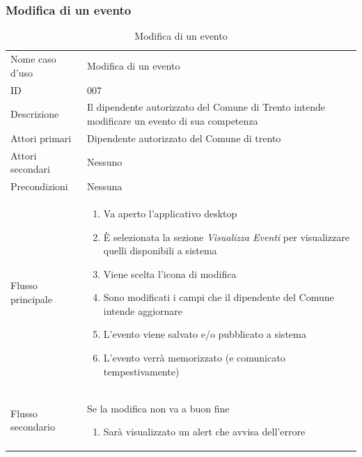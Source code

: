 \documentclass{article}
\begin{document}
\clearpage

\subsubsection{Modifica di un evento}

\begin{table}[htbp]
    \label{8.3.3}
    \centering
    \begin{tabularx}{\textwidth}{| l | p{} |}
        \Xhline{2pt} %
        Nome caso d'uso & Modifica di un evento \\
        \Xhline{2pt} %
        ID & 007 \\
        \hline
        Descrizione & Il dipendente autorizzato del Comune di Trento intende modificare un evento di sua competenza\\
        \hline
        Attori primari & Dipendente autorizzato del Comune di trento\\
        \hline
        Attori secondari & Nessuno \\
        \hline
        Precondizioni & Nessuna \\
        \hline
        Flusso principale & 
        \begin{enumerate}[topsep=5pt,partopsep=0pt,parsep=0pt,itemsep=0pt,before=\vspace{-\baselineskip},after=\vspace{-\baselineskip}]                
            \item Va aperto l'applicativo desktop
            \item È selezionata la sezione \textit{Visualizza Eventi} per visualizzare quelli disponibili a sistema
            \item Viene scelta l'icona di modifica
            \item Sono modificati i campi che il dipendente del Comune intende aggiornare
            \item L'evento viene salvato e/o pubblicato a sistema
            \item L'evento verrà memorizzato (e comunicato tempestivamente)
        \end{enumerate}
        \\
        \hline
        Flusso secondario & 
        Se la modifica non va a buon fine
        \begin{enumerate}[topsep=10pt,partopsep=0pt,parsep=0pt,itemsep=0pt,before=\vspace{-\baselineskip},after=\vspace{-\baselineskip}]                
            \item Sarà visualizzato un alert che avvisa dell'errore
        \end{enumerate}
        \\
        \hline
    \end{tabularx}
    \caption{Modifica di un evento}
    \label{tab:tabella_use_case007}
\end{table}
\end{document}
